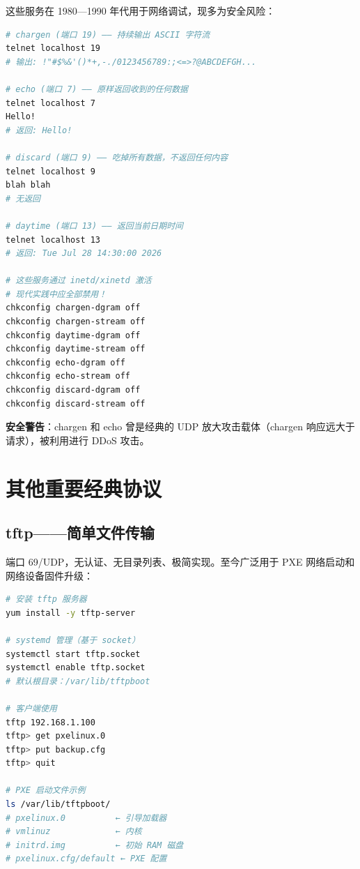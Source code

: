 \documentclass[12pt,UTF8]{ctexbook}
\begin{document}
这些服务在 1980—1990 年代用于网络调试，现多为安全风险：

\begin{lstlisting}[language=bash]
# chargen (端口 19) —— 持续输出 ASCII 字符流
telnet localhost 19
# 输出: !"#$%&'()*+,-./0123456789:;<=>?@ABCDEFGH...

# echo (端口 7) —— 原样返回收到的任何数据
telnet localhost 7
Hello!
# 返回: Hello!

# discard (端口 9) —— 吃掉所有数据，不返回任何内容
telnet localhost 9
blah blah
# 无返回

# daytime (端口 13) —— 返回当前日期时间
telnet localhost 13
# 返回: Tue Jul 28 14:30:00 2026

# 这些服务通过 inetd/xinetd 激活
# 现代实践中应全部禁用！
chkconfig chargen-dgram off
chkconfig chargen-stream off
chkconfig daytime-dgram off
chkconfig daytime-stream off
chkconfig echo-dgram off
chkconfig echo-stream off
chkconfig discard-dgram off
chkconfig discard-stream off
\end{lstlisting}

\textbf{安全警告}：chargen 和 echo 曾是经典的 UDP 放大攻击载体（chargen 响应远大于请求），被利用进行 DDoS 攻击。

\section{其他重要经典协议}
\label{sec:other-legacy}

\subsection{tftp——简单文件传输}

端口 69/UDP，无认证、无目录列表、极简实现。至今广泛用于 PXE 网络启动和网络设备固件升级：

\begin{lstlisting}[language=bash]
# 安装 tftp 服务器
yum install -y tftp-server

# systemd 管理（基于 socket）
systemctl start tftp.socket
systemctl enable tftp.socket
# 默认根目录：/var/lib/tftpboot

# 客户端使用
tftp 192.168.1.100
tftp> get pxelinux.0
tftp> put backup.cfg
tftp> quit

# PXE 启动文件示例
ls /var/lib/tftpboot/
# pxelinux.0          ← 引导加载器
# vmlinuz             ← 内核
# initrd.img          ← 初始 RAM 磁盘
# pxelinux.cfg/default ← PXE 配置
\end{lstlisting}
\end{document}

